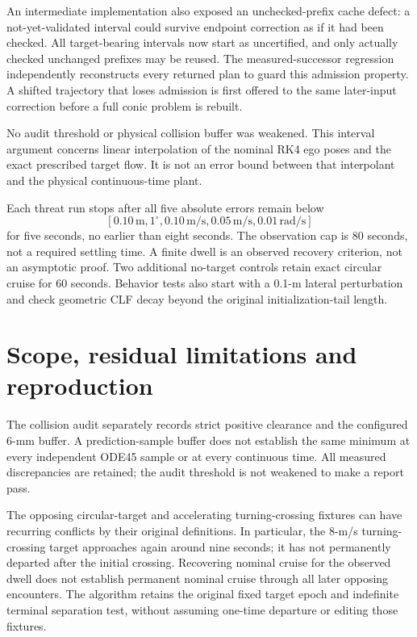 \documentclass[11pt]{article}
\begin{document}
An intermediate implementation also exposed an unchecked-prefix cache
defect: a not-yet-validated interval could survive endpoint correction as
if it had been checked. All target-bearing intervals now start as
uncertified, and only actually checked unchanged prefixes may be reused.
The measured-successor regression independently reconstructs every
returned plan to guard this admission property. A shifted trajectory
that loses admission is first offered to the same later-input correction
before a full conic problem is rebuilt.

No audit threshold or physical collision buffer was weakened. This
interval argument concerns linear interpolation of the nominal RK4 ego
poses and the exact prescribed target flow. It is not an error bound
between that interpolant and the physical continuous-time plant.

Each threat run stops after all five absolute errors remain below
\[
[0.10\,\mathrm m,1^\circ,0.10\,\mathrm{m/s},0.05\,\mathrm{m/s},
0.01\,\mathrm{rad/s}]
\]
for five seconds, no earlier than eight seconds.
The observation cap is 80 seconds, not a required settling time. A finite
dwell is an observed recovery criterion, not an asymptotic proof.
Two additional no-target controls retain exact circular cruise for 60
seconds. Behavior tests also start with a 0.1-m lateral perturbation and
check geometric CLF decay beyond the original initialization-tail length.



\section{Scope, residual limitations and reproduction}
The collision audit separately records strict positive clearance and the
configured 6-mm buffer. A prediction-sample buffer does not establish the
same minimum at every independent ODE45 sample or at every continuous
time. All measured discrepancies are retained; the audit threshold is
not weakened to make a report pass.

The opposing circular-target and accelerating turning-crossing fixtures
can have recurring conflicts by their original definitions. In particular,
the 8-m/s turning-crossing target approaches again around nine seconds;
it has not permanently departed after the initial crossing.
Recovering nominal cruise for the observed
dwell does not establish permanent nominal cruise through all later
opposing encounters. The algorithm retains the original fixed target
epoch and indefinite terminal separation test, without assuming one-time
departure or editing those fixtures.
\end{document}
